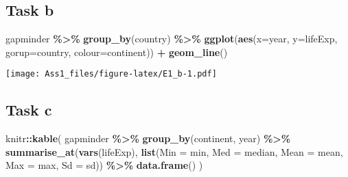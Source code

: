 \documentclass[
]{article}
\newenvironment{Shaded}{\begin{snugshade}}{\end{snugshade}}
\newcommand{\AttributeTok}[1]{\textcolor[rgb]{0.13,0.29,0.53}{#1}}
\newcommand{\FunctionTok}[1]{\textcolor[rgb]{0.13,0.29,0.53}{\textbf{#1}}}
\newcommand{\NormalTok}[1]{#1}
\newcommand{\SpecialCharTok}[1]{\textcolor[rgb]{0.81,0.36,0.00}{\textbf{#1}}}
\begin{document}
\subsection{Task b}\label{task-b}

\begin{Shaded}
\begin{Highlighting}[]
\NormalTok{gapminder }\SpecialCharTok{\%\textgreater{}\%}
  \FunctionTok{group\_by}\NormalTok{(country) }\SpecialCharTok{\%\textgreater{}\%}
  \FunctionTok{ggplot}\NormalTok{(}\FunctionTok{aes}\NormalTok{(}\AttributeTok{x=}\NormalTok{year, }\AttributeTok{y=}\NormalTok{lifeExp, }\AttributeTok{gorup=}\NormalTok{country,  }\AttributeTok{colour=}\NormalTok{continent)) }\SpecialCharTok{+}
    \FunctionTok{geom\_line}\NormalTok{()}
\end{Highlighting}
\end{Shaded}

\texttt{[image: Ass1\_files/figure-latex/E1\_b-1.pdf]}

\subsection{Task c}\label{task-c}

\begin{Shaded}
\begin{Highlighting}[]
\NormalTok{knitr}\SpecialCharTok{::}\FunctionTok{kable}\NormalTok{(}
\NormalTok{  gapminder }\SpecialCharTok{\%\textgreater{}\%}
    \FunctionTok{group\_by}\NormalTok{(continent, year) }\SpecialCharTok{\%\textgreater{}\%}
    \FunctionTok{summarise\_at}\NormalTok{(}\FunctionTok{vars}\NormalTok{(lifeExp), }\FunctionTok{list}\NormalTok{(}\AttributeTok{Min =}\NormalTok{ min, }\AttributeTok{Med =}\NormalTok{ median, }\AttributeTok{Mean =}\NormalTok{ mean, }\AttributeTok{Max =}\NormalTok{ max, }\AttributeTok{Sd =}\NormalTok{ sd)) }\SpecialCharTok{\%\textgreater{}\%}
    \FunctionTok{data.frame}\NormalTok{()}
\NormalTok{)}
\end{Highlighting}
\end{Shaded}
\end{document}
